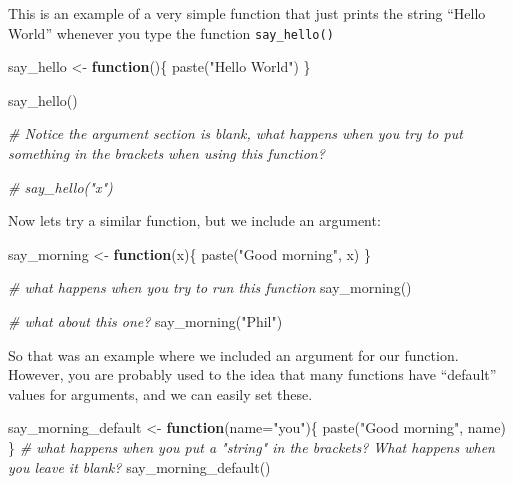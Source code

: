 \documentclass[
]{book}
\newenvironment{Shaded}{\begin{snugshade}}{\end{snugshade}}
\newcommand{\AttributeTok}[1]{\textcolor[rgb]{0.77,0.63,0.00}{#1}}
\newcommand{\CommentTok}[1]{\textcolor[rgb]{0.56,0.35,0.01}{\textit{#1}}}
\newcommand{\ControlFlowTok}[1]{\textcolor[rgb]{0.13,0.29,0.53}{\textbf{#1}}}
\newcommand{\FunctionTok}[1]{\textcolor[rgb]{0.00,0.00,0.00}{#1}}
\newcommand{\NormalTok}[1]{#1}
\newcommand{\OtherTok}[1]{\textcolor[rgb]{0.56,0.35,0.01}{#1}}
\newcommand{\StringTok}[1]{\textcolor[rgb]{0.31,0.60,0.02}{#1}}
\begin{document}
This is an example of a very simple function that just prints the string ``Hello World'' whenever you type the function \texttt{say\_hello()}

\begin{Shaded}
\begin{Highlighting}[]
\NormalTok{say\_hello }\OtherTok{\textless{}{-}} \ControlFlowTok{function}\NormalTok{()\{}
  \FunctionTok{paste}\NormalTok{(}\StringTok{"Hello World"}\NormalTok{) }
\NormalTok{\}}

\FunctionTok{say\_hello}\NormalTok{()}

\CommentTok{\# Notice the argument section is blank, what happens when you try to put something in the brackets when using this function?}

\CommentTok{\# say\_hello("x")}
\end{Highlighting}
\end{Shaded}

Now lets try a similar function, but we include an argument:

\begin{Shaded}
\begin{Highlighting}[]
\NormalTok{say\_morning }\OtherTok{\textless{}{-}} \ControlFlowTok{function}\NormalTok{(x)\{}
  \FunctionTok{paste}\NormalTok{(}\StringTok{"Good morning"}\NormalTok{, x)}
\NormalTok{\}}

\CommentTok{\# what happens when you try to run this function}
\FunctionTok{say\_morning}\NormalTok{() }

\CommentTok{\#  what about this one?}
\FunctionTok{say\_morning}\NormalTok{(}\StringTok{"Phil"}\NormalTok{)}
\end{Highlighting}
\end{Shaded}

So that was an example where we included an argument for our function. However, you are probably used to the idea that many functions have ``default'' values for arguments, and we can easily set these.

\begin{Shaded}
\begin{Highlighting}[]
\NormalTok{say\_morning\_default }\OtherTok{\textless{}{-}} \ControlFlowTok{function}\NormalTok{(}\AttributeTok{name=}\StringTok{"you"}\NormalTok{)\{}
  \FunctionTok{paste}\NormalTok{(}\StringTok{"Good morning"}\NormalTok{, name)}
\NormalTok{\}}
\CommentTok{\# what happens when you put a "string" in the brackets? What happens when you leave it blank?}
\FunctionTok{say\_morning\_default}\NormalTok{()}
\end{Highlighting}
\end{Shaded}
\end{document}
